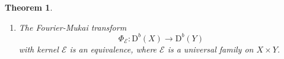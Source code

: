 \documentclass[12pt,a4paper]{amsart}
\theoremstyle{plain}
\newtheorem{thm}{Theorem}[section]
\theoremstyle{definition}
\theoremstyle{remark}
\newcommand{\D}{\mathrm{D}^b}
\newcommand{\kE}{\mathcal{E}}
\newcommand{\rk}{\mathrm{rk}}
\newcommand{\dv}{\mathrm{div}}
\newcommand{\cc}{c}
\begin{document}
\begin{thm}
\begin{enumerate}[label=$\bullet$]
    \begin{minipage}[l]{0.40\textwidth}
    \begin{equation*}
        \cc_1(E)= \bigg\{\begin{array}{ll}
           r^{n-1}n! w  & \textit{if }\dv(w) \textit{ is odd} \\
           r^{n-1}n! \frac{w}{2}  & \textit{if }\dv(w) \textit{ is even}
        \end{array}
    \end{equation*}
\end{minipage}
\hspace{1ex}%
\begin{minipage}[l]{0.35\textwidth}
    \begin{align*}
       \rk(E)&= r^n n!\\
        \Delta(E) &= \frac{(r^n n!)^2}{12}\cc_2(Y).\end{align*}
\end{minipage}
\vspace{0.5ex}

    
    \item The Fourier-Mukai transform $$\Phi_\kE \colon \D(X) \to \D(Y)$$ with kernel $\kE$ is an equivalence, where $\mathcal{E}$ is a  universal family on $X\times Y$.

\end{enumerate}    
\end{thm}
\end{document}
